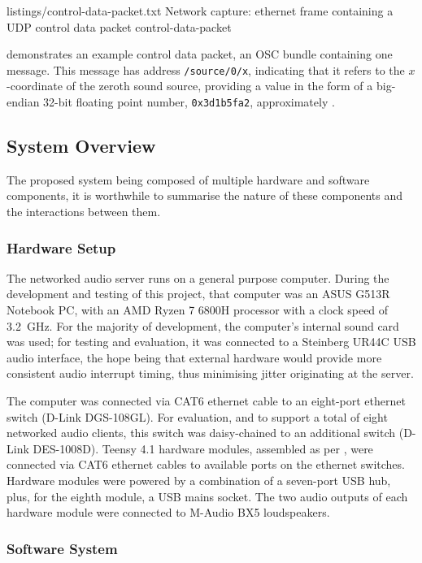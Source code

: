 {listings/control-data-packet.txt}
{Network capture: ethernet frame containing a UDP control data packet}
{control-data-packet}

 demonstrates an example control data
packet, an OSC bundle containing one message.
This message has address \texttt{/source/0/x}, indicating that it refers to the
$x$-coordinate of the zeroth sound source, providing a value in the form of a
big-endian 32-bit floating point number, \texttt{0x3d1b5fa2}, approximately
.

\subsection{System Overview}\label{subsec:system-overview}

The proposed system being composed of multiple hardware and software components,
it is worthwhile to summarise the nature of these components and the
interactions between them.

\subsubsection{Hardware Setup}

The networked audio server runs on a general purpose computer.
During the development and testing of this project, that computer was an ASUS
G513R Notebook PC, with an AMD Ryzen 7 6800H processor with a clock
speed of \qty{3.2}{\GHz}.
For the majority of development, the computer's internal sound card was used;
for testing and evaluation, it was connected to a Steinberg UR44C USB audio
interface, the hope being that external hardware would provide more consistent
audio interrupt timing, thus minimising jitter originating at the server.

The computer was connected via CAT6 ethernet cable to an eight-port ethernet
switch (D-Link DGS-108GL).
For evaluation, and to support a total of eight networked audio clients, this
switch was daisy-chained to an additional switch (D-Link DES-1008D).
Teensy 4.1 hardware modules, assembled as per , were
connected via CAT6 ethernet cables to available ports on the ethernet switches.
Hardware modules were powered by a combination of a seven-port USB hub, plus,
for the eighth module, a USB mains socket.
The two audio outputs of each hardware module were connected to M-Audio BX5
loudspeakers.

\subsubsection{Software System}\label{subsubsec:software-system}

